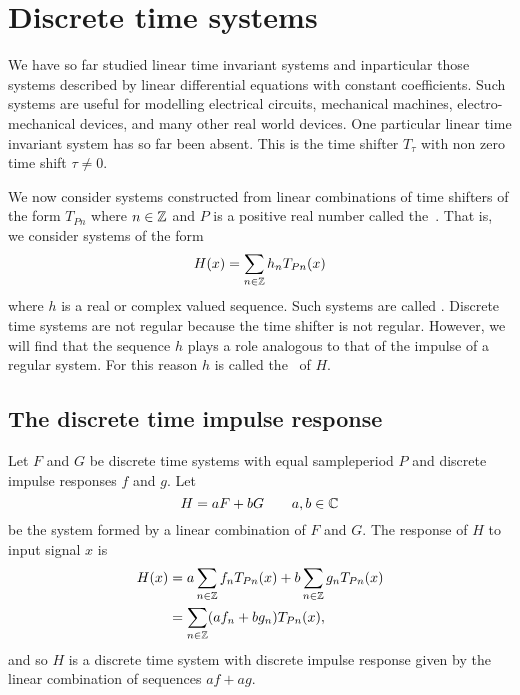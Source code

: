 \chapter{Discrete time systems} \label{cha:discr-time-syst}

We have so far studied linear time invariant systems and inparticular those systems described by linear differential equations with constant coefficients.  Such systems are useful for modelling electrical circuits, mechanical machines, electro-mechanical devices, and many other real world devices.  One particular linear time invariant system has so far been absent. This is the time shifter $T_\tau$ with non zero time shift $\tau \neq 0$.  %

We now consider systems constructed from linear combinations of time shifters of the form $T_{Pn}$ where $n \in {\mathbb Z}$ and $P$ is a positive real number called the~.  That is, we consider systems of the form
\[
H(x) = \sum_{n \in {\mathbb Z}} h_n T_{ P n}(x)
\]
where $h$ is a real or complex valued sequence.  Such systems are called .  Discrete time systems are not regular because the time shifter is not regular.  However, we will find that the sequence $h$ plays a role analogous to that of the impulse of a regular system.  For this reason $h$  is called the~ of $H$.


\section{The discrete time impulse response} \label{sec:discr-time-impulse}

Let $F$ and $G$ be discrete time systems with equal sampleperiod $P$ and discrete impulse responses $f$ and $g$.  Let 
\[
H = a F + b G \qquad a,b\in{\mathbb C}
\]
be the system formed by a linear combination of $F$ and $G$.  The response of $H$ to input signal $x$ is
\begin{align*}
H(x) &= a \sum_{n \in {\mathbb Z}} f_{n} T_{ P n}(x) + b \sum_{n \in {\mathbb Z}} g_{n} T_{ P n}(x) \\
&=  \sum_{n \in {\mathbb Z}} (a f_{n} + b g_{n}) T_{ P n}(x),
\end{align*}
and so $H$ is a discrete time system with discrete impulse response given by the linear combination of sequences $af + ag$.


